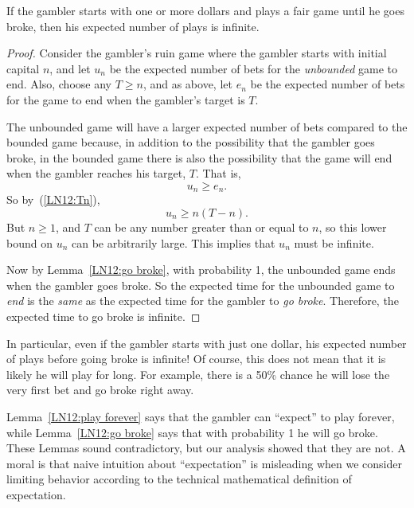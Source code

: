\begin{staffnotes}
\begin{lemma}\label{LN12:play forever}
If the gambler starts with one or more dollars and plays a fair game until
he goes broke, then his expected number of plays is infinite.
\end{lemma}

\begin{proof}
Consider the gambler's ruin game where the gambler starts with initial
capital $n$, and let $u_n$ be the expected number of bets for
the \emph{unbounded} game to end.  Also, choose any $T \geq n$, and as
above, let $e_n$ be the expected number of bets for the game to end when
the gambler's target is $T$.

The unbounded game will have a larger expected number of bets compared to
the bounded game because, in addition to the possibility that the gambler
goes broke, in the bounded game there is also the possibility that the
game will end when the gambler reaches his target, $T$.  That is,
\[
u_n \geq e_n.
\]
So by~(\ref{LN12:Tn}), 
\[
u_n \geq n(T-n).
\]
But $n \geq 1$, and $T$ can be any number greater than or equal to $n$, so
this lower bound on $u_n$ can be arbitrarily large.  This implies that
$u_n$ must be infinite.

Now by Lemma~\ref{LN12:go broke}, with probability 1, the unbounded game ends
when the gambler goes broke.  So the expected time for the unbounded game
to \emph{end} is the \emph{same} as the expected time for the gambler to
\emph{go broke}.  Therefore, the expected time to go broke is infinite.
\end{proof}

In particular, even if the gambler starts with just one dollar, his
expected number of plays before going broke is infinite!  Of course, this
does not mean that it is likely he will play for long.  For example, there
is a 50\% chance he will lose the very first bet and go broke right away.

Lemma~\ref{LN12:play forever} says that the gambler can ``expect'' to play
forever, while Lemma~\ref{LN12:go broke} says that with probability 1 he will
go broke.  These Lemmas sound contradictory, but our analysis showed that
they are not.  A moral is that naive intuition about ``expectation'' is
misleading when we consider limiting behavior according to the technical
mathematical definition of expectation.

\end{staffnotes}


